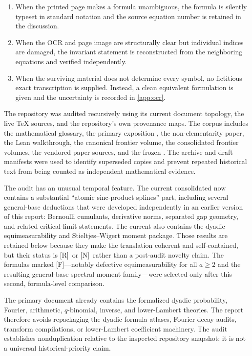 \documentclass[11pt,oneside]{article}
\theoremstyle{definition}
\theoremstyle{remark}
\newcommand{\Rmark}{\textcolor{sourceblue}{\textsf{[R]}}}
\newcommand{\Nmark}{\textcolor{newgreen}{\textsf{[N]}}}
\newcommand{\Fmark}{\textcolor{frontierpurple}{\textsf{[F]}}}
\begin{document}
\begin{enumerate}
\item When the printed page makes a formula unambiguous, the formula is silently typeset in
      standard notation and the source equation number is retained in the discussion.
\item When the OCR and page image are structurally clear but individual indices are damaged,
      the invariant statement is reconstructed from the neighboring equations and verified
      independently.
\item When the surviving material does not determine every symbol, no fictitious exact
      transcription is supplied.  Instead, a clean equivalent formulation is given and the
      uncertainty is recorded in \cref{app:ocr}.
\end{enumerate}

The repository was audited recursively using its current document topology, the live TeX
sources, and the repository's own provenance maps.  The corpus includes the mathematical
glossary, the primary exposition
, the
non-elementarity paper, the Lean walkthrough, the canonical frontier volume, the consolidated
frontier volumes, the vendored paper sources, and the frozen .  The archive and
draft manifests were used to identify superseded copies and prevent repeated historical text
from being counted as independent mathematical evidence.

The audit has an unusual temporal feature.  The current consolidated
 now contains a substantial ``atomic sinc-product
splines'' part, including several general-base deductions that were developed independently in
an earlier version of this report: Bernoulli cumulants, derivative norms, separated gap geometry,
and related critical-limit statements.  The current
 also contains the dyadic equimeasurability and
Stieltjes--Wigert moment package.  Those results are retained below because they make the
translation coherent and self-contained, but their status is \Rmark\ or \Nmark\ rather than a
post-audit novelty claim.  The formulas marked \Fmark---notably defective equimeasurability for
all $a\ge2$ and the resulting general-base spectral moment family---were selected only after this
second, formula-level comparison.

The primary document already contains the formalized dyadic probability, Fourier, arithmetic,
$q$-binomial, inverse, and lower-Lambert theories.  The report therefore avoids repackaging the
dyadic formula atlases, Fourier-decay audits, transform compilations, or lower-Lambert
coefficient machinery.  The audit establishes nonduplication relative to the inspected
repository snapshot; it is not a universal historical-priority claim.
\end{document}
